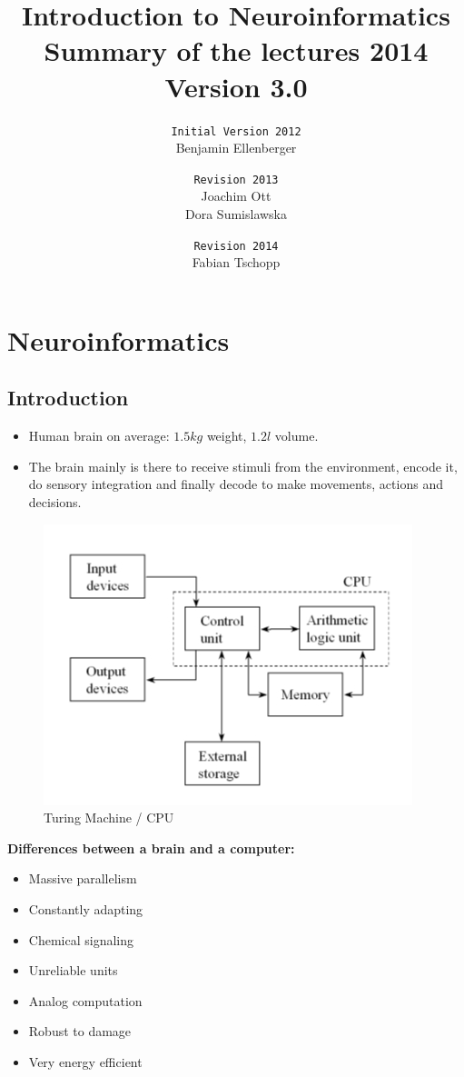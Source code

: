 \documentclass[a4paper, 12pt]{article}
\title{\textbf{Introduction to Neuroinformatics} \\Summary of the lectures 2014\\\normalsize Version 3.0}
\author{
\texttt{Initial Version 2012}\\
	Benjamin Ellenberger
\and
\texttt{Revision 2013}\\
	Joachim Ott\\Dora Sumislawska
\and
\texttt{Revision 2014}\\
	Fabian Tschopp}
\date{}
\begin{document}
\maketitle
\newpage
\tableofcontents
\newpage

\section{Neuroinformatics}
\subsection{Introduction}
\begin{itemize}[noitemsep,nolistsep]
	\item Human brain on average: $1.5 kg$ weight, $1.2 l$ volume.
	\item The brain mainly is there to receive stimuli from the environment, encode it, do sensory integration and finally decode to make movements, actions and decisions.
\end{itemize}
\begin{figure}[htbp]
	\centering
	\includegraphics[scale=0.6]{1_2.jpg}
 	\caption{Turing Machine / CPU}
\end{figure} 
\textbf{Differences between a brain and a computer:}
\begin{itemize}[noitemsep,nolistsep]
	\item Massive parallelism
	\item Constantly adapting
	\item Chemical signaling
	\item Unreliable units
	\item Analog computation
	\item Robust to damage
	\item Very energy efficient
\end{itemize}
\end{document}

